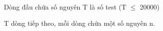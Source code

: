 Dòng đầu chứa số nguyên T là số test (T  $\le$  20000)  

   T dòng tiếp theo, mỗi dòng chứa một số nguyên n.